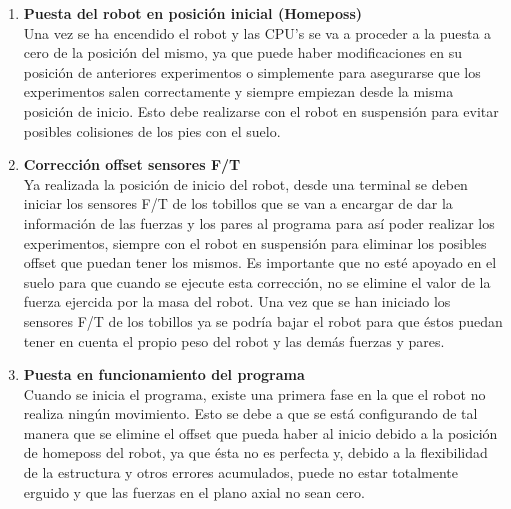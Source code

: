 \begin{enumerate}



\item \textbf{Puesta del robot en posición inicial (Homeposs)}\\ Una vez se ha encendido el robot y las CPU's se va a proceder a la puesta a cero de la posición del mismo, ya que puede haber modificaciones en su posición de anteriores experimentos o simplemente para asegurarse que los experimentos salen correctamente y siempre empiezan desde la misma posición de inicio. Esto debe realizarse con el robot en suspensión para evitar posibles colisiones de los pies con el suelo.

\item \textbf{Corrección offset sensores F/T}\\ Ya realizada la posición de inicio del robot, desde una terminal se deben iniciar los sensores F/T de los tobillos que se van a encargar de dar la información de las fuerzas y los pares al programa para así poder realizar los experimentos, siempre con el robot en suspensión para eliminar los posibles offset que puedan tener los mismos. Es importante que no esté apoyado en el suelo para que cuando se ejecute esta corrección, no se elimine el valor de la fuerza ejercida por la masa del robot. Una vez que se han iniciado los sensores F/T de los tobillos ya se podría bajar el robot para que éstos puedan tener en cuenta el propio peso del robot y las demás fuerzas y pares. 

\item \textbf{Puesta en funcionamiento del programa}\\ Cuando se inicia el programa, existe una primera fase en la que el robot no realiza ningún movimiento. Esto se debe a que se está configurando de tal manera que se elimine el offset que pueda haber al inicio debido a la posición de homeposs del robot, ya que ésta no es perfecta y, debido a la flexibilidad de la estructura y otros errores acumulados, puede no estar totalmente erguido y que las fuerzas en el plano axial no sean cero. 


\end{enumerate}
